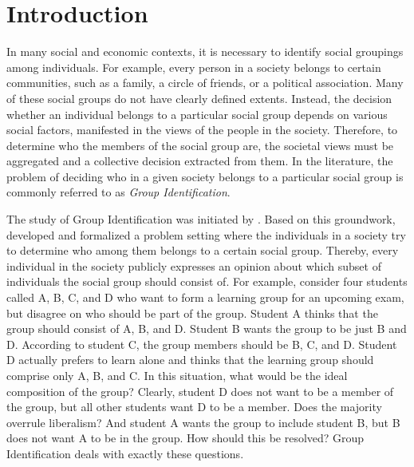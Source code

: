 \documentclass[
    12pt,               %
    a4paper,            %
    bibtotoc,           %
    pointlessnumbers,   %
    ngerman,            %
    titlepage,          %
    leqno,              %
    ]{scrarticle}       %
\begin{document}
\cleardoublepage

\pagestyle{plain}
\setcounter{page}{1}

\renewcommand\cellalign{lt}
\setlength\tabcolsep{4pt}




\section{Introduction}
\label{sec:intro}

In many social and economic contexts, it is necessary to identify social groupings among individuals. For example, every person in a society belongs to certain communities, such as a family, a circle of friends, or a political association. Many of these social groups do not have clearly defined extents. Instead, the decision whether an individual belongs to a particular social group depends on various social factors, manifested in the views of the people in the society. Therefore, to determine who the members of the social group are, the societal views must be aggregated and a collective decision extracted from them. In the literature, the problem of deciding who in a given society belongs to a particular social group is commonly referred to as \emph{Group Identification}.


The study of Group Identification was initiated by \textcite{K93}. Based on this groundwork, \textcite{KR97} developed and formalized a problem setting where the individuals in a society try to determine who among them belongs to a certain social group. Thereby, every individual in the society publicly expresses an opinion about which subset of individuals the social group should consist of. For example, consider four students called A, B, C, and D who want to form a learning group for an upcoming exam, but disagree on who should be part of the group. Student A thinks that the group should consist of A, B, and D. Student B wants the group to be just B and D. According to student C, the group members should be B, C, and D. Student D actually prefers to learn alone and thinks that the learning group should comprise only A, B, and C. In this situation, what would be the ideal composition of the group? Clearly, student D does not want to be a member of the group, but all other students want D to be a member. Does the majority overrule liberalism? And student A wants the group to include student B, but B does not want A to be in the group. How should this be resolved? Group Identification deals with exactly these questions.
\end{document}
